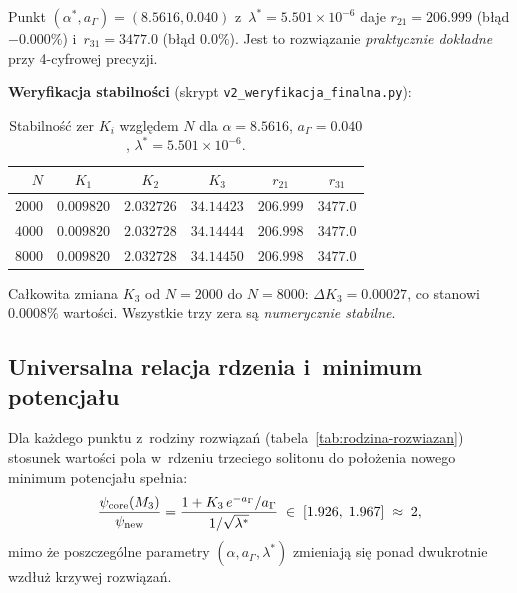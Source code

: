 \begin{remark}
Punkt $(\alpha^*, a_\Gamma) = (8.5616, 0.040)$ z~$\lambda^* = 5.501\times10^{-6}$
daje $r_{21} = 206.999$ (błąd $-0.000\%$) i~$r_{31} = 3477.0$ (błąd $0.0\%$).
Jest to rozwiązanie \emph{praktycznie dokładne} przy 4-cyfrowej precyzji.
\end{remark}

\textbf{Weryfikacja stabilności} (skrypt \texttt{v2\_weryfikacja\_finalna.py}):
\begin{table}[h]
\centering
\small
\caption{Stabilność zer $K_i$ względem $N$ dla $\alpha=8.5616$,
  $a_\Gamma=0.040$, $\lambda^*=5.501\times10^{-6}$.}
\label{tab:stabilnosc-zer}
\begin{tabular}{@{}rccccc@{}}
\toprule
$N$ & $K_1$ & $K_2$ & $K_3$ & $r_{21}$ & $r_{31}$ \\
\midrule
$2000$ & $0.009820$ & $2.032726$ & $34.14423$ & $206.999$ & $3477.0$ \\
$4000$ & $0.009820$ & $2.032728$ & $34.14444$ & $206.998$ & $3477.0$ \\
$8000$ & $0.009820$ & $2.032728$ & $34.14450$ & $206.998$ & $3477.0$ \\
\bottomrule
\end{tabular}
\end{table}

Całkowita zmiana $K_3$ od $N=2000$ do $N=8000$: $\Delta K_3 = 0.00027$,
co stanowi $0.0008\%$ wartości. Wszystkie trzy zera są \emph{numerycznie stabilne}.

\subsection{Universalna relacja rdzenia i~minimum potencjału}%
\label{app:I-relacja}

\begin{proposition}%
\label{prop:universalna-relacja}
Dla każdego punktu z~rodziny rozwiązań (tabela~\ref{tab:rodzina-rozwiazan})
stosunek wartości pola w~rdzeniu trzeciego solitonu do położenia
nowego minimum potencjału spełnia:
\begin{equation}\label{eq:universalna-relacja}
    \frac{\psi_{\rm core}(M_3)}{\psi_{\rm new}}
    = \frac{1 + K_3\, e^{-a_\Gamma}/a_\Gamma}{1/\sqrt{\lambda^*}}
    \;\in\; [1.926,\; 1.967]
    \;\approx\; 2,
\end{equation}
mimo że poszczególne parametry $(\alpha, a_\Gamma, \lambda^*)$
zmieniają się ponad dwukrotnie wzdłuż krzywej rozwiązań.
\end{proposition}

